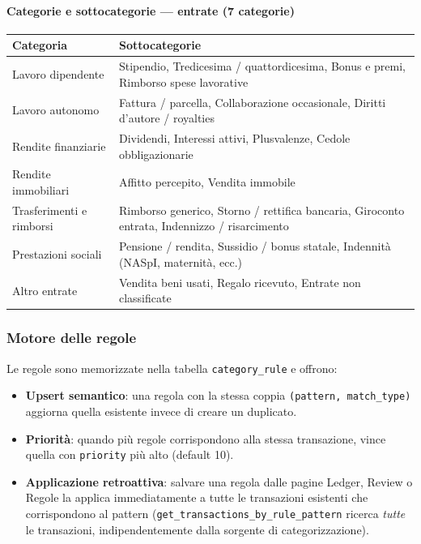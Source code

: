 \documentclass[11pt, a4paper]{article}
\begin{document}
\paragraph{Categorie e sottocategorie --- entrate (7 categorie)}

\begin{center}
\small
\begin{longtable}{@{}L{4cm} L{9cm}@{}}
\toprule
\textbf{Categoria} & \textbf{Sottocategorie} \\
\midrule
\endhead
Lavoro dipendente
  & Stipendio, Tredicesima / quattordicesima, Bonus e premi,
    Rimborso spese lavorative \\[4pt]
Lavoro autonomo
  & Fattura / parcella, Collaborazione occasionale,
    Diritti d'autore / royalties \\[4pt]
Rendite finanziarie
  & Dividendi, Interessi attivi, Plusvalenze,
    Cedole obbligazionarie \\[4pt]
Rendite immobiliari
  & Affitto percepito, Vendita immobile \\[4pt]
Trasferimenti e rimborsi
  & Rimborso generico, Storno / rettifica bancaria,
    Giroconto entrata, Indennizzo / risarcimento \\[4pt]
Prestazioni sociali
  & Pensione / rendita, Sussidio / bonus statale,
    Indennità (NASpI, maternità, ecc.) \\[4pt]
Altro entrate
  & Vendita beni usati, Regalo ricevuto,
    Entrate non classificate \\
\bottomrule
\end{longtable}
\end{center}

\subsubsection{Motore delle regole}
\label{sec:rules}

Le regole sono memorizzate nella tabella \texttt{category\_rule} e offrono:

\begin{itemize}[leftmargin=2em]
  \item \textbf{Upsert semantico}: una regola con la stessa coppia
        \texttt{(pattern, match\_type)} aggiorna quella esistente invece di creare
        un duplicato.
  \item \textbf{Priorità}: quando più regole corrispondono alla stessa transazione,
        vince quella con \texttt{priority} più alto (default 10).
  \item \textbf{Applicazione retroattiva}: salvare una regola dalle pagine Ledger, Review
        o Regole la applica immediatamente a tutte le transazioni esistenti che
        corrispondono al pattern (\texttt{get\_transactions\_by\_rule\_pattern} ricerca
        \emph{tutte} le transazioni, indipendentemente dalla sorgente di categorizzazione).
\end{itemize}
\end{document}
